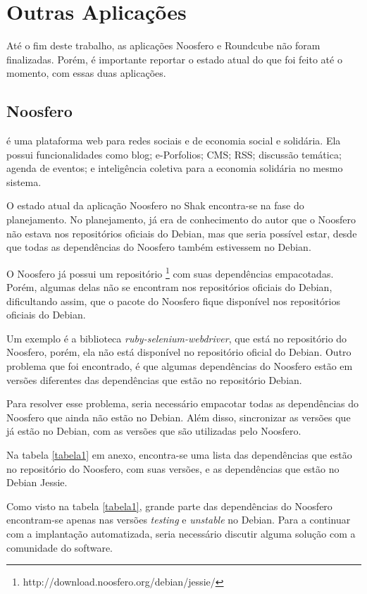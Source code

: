 \section{Outras Aplicações}
\label{sub:appnencerradas}

Até o fim deste trabalho, as aplicações Noosfero e Roundcube não foram finalizadas. 
Porém, é importante reportar o estado atual do que foi feito até o momento,
com essas duas aplicações.

\subsection{Noosfero}
\label{subsub:noosfero}

 é uma plataforma web para redes sociais e 
de economia social e solidária. Ela possui funcionalidades como blog; e-Porfolios; 
CMS; RSS; discussão temática; agenda de eventos; e inteligência coletiva para a 
economia solidária no mesmo sistema.

O estado atual da aplicação Noosfero no Shak encontra-se
na fase do planejamento. No planejamento, já era de conhecimento do autor que o
Noosfero não estava nos repositórios oficiais do Debian, mas que seria possível estar, 
desde que todas as dependências do Noosfero também estivessem no Debian.

O Noosfero já possui um repositório \footnote{http://download.noosfero.org/debian/jessie/}
com suas dependências empacotadas. Porém, algumas delas não se encontram nos repositórios
oficiais do Debian, dificultando assim, que o pacote do Noosfero fique disponível
nos repositórios oficiais do Debian. 

Um exemplo é a biblioteca \textit{ruby-selenium-webdriver}, que
está no repositório do Noosfero, porém, ela não está disponível no repositório oficial
do Debian. Outro problema que foi encontrado, é que algumas dependências do Noosfero
estão em versões diferentes das dependências que estão no repositório Debian.

Para resolver esse problema, seria necessário empacotar todas as dependências
do Noosfero que ainda não estão no Debian. Além disso, sincronizar as versões
que já estão no Debian, com as versões que são utilizadas pelo Noosfero.

Na tabela \ref{tabela1} em anexo, encontra-se uma lista das dependências 
que estão no repositório do Noosfero,
com suas versões, e as dependências que estão no Debian Jessie.

Como visto na tabela \ref{tabela1}, grande parte das dependências do Noosfero encontram-se
 apenas nas versões \textit{testing} e \textit{unstable} no Debian. Para a continuar com
a implantação automatizada, seria necessário discutir alguma solução 
com a comunidade do software. 

